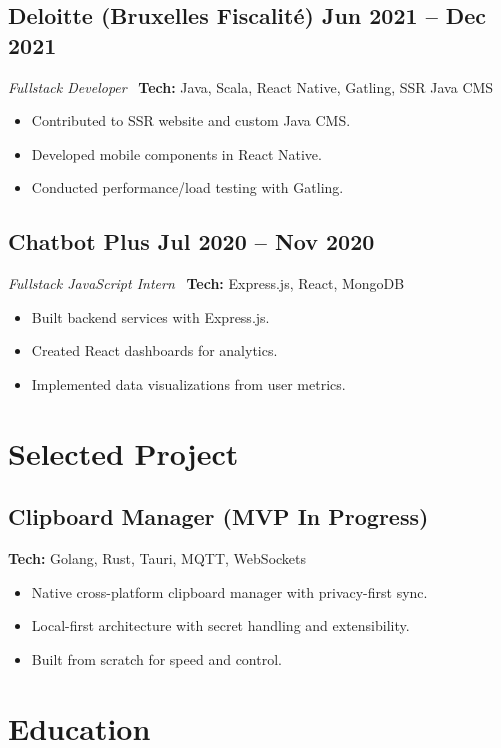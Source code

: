 \documentclass[11pt,a4paper]{article}
\begin{document}
\subsection{Deloitte (Bruxelles Fiscalité) \hfill Jun 2021 -- Dec 2021}
\textit{Fullstack Developer} \
\textbf{Tech:} Java, Scala, React Native, Gatling, SSR Java CMS
\begin{itemize}[leftmargin=*]
    \item Contributed to SSR website and custom Java CMS.
    \item Developed mobile components in React Native.
    \item Conducted performance/load testing with Gatling.
\end{itemize}

\subsection{Chatbot Plus \hfill Jul 2020 -- Nov 2020}
\textit{Fullstack JavaScript Intern} \
\textbf{Tech:} Express.js, React, MongoDB
\begin{itemize}[leftmargin=*]
    \item Built backend services with Express.js.
    \item Created React dashboards for analytics.
    \item Implemented data visualizations from user metrics.
\end{itemize}

\section*{Selected Project}
\subsection{Clipboard Manager (MVP In Progress)}
\textbf{Tech:} Golang, Rust, Tauri, MQTT, WebSockets
\begin{itemize}[leftmargin=*]
    \item Native cross-platform clipboard manager with privacy-first sync.
    \item Local-first architecture with secret handling and extensibility.
    \item Built from scratch for speed and control.
\end{itemize}

\section*{Education}
\end{document}

